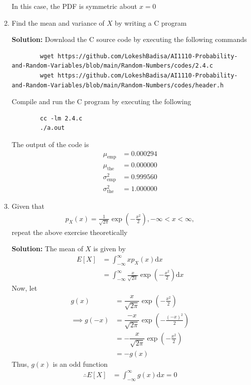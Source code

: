 \documentclass[journal,12pt,twocolumn]{IEEEtran}
\newcommand{\solution}{\noindent \textbf{Solution: }}
\providecommand{\brak}[1]{\ensuremath{\left(#1\right)}}
\providecommand{\mean}[1]{E\left[ #1 \right]}
\numberwithin{equation}{section}
\renewcommand\thesection{\arabic{section}}
\begin{document}
\begin{enumerate}[label=\thesection.\arabic*,ref=\thesection.\theenumi]
	In this case, the PDF is symmetric about $x = 0$
	
	\item Find the mean and variance of $X$ by writing a C program
	
	\solution Download the C source code by executing the following commands
	\begin{lstlisting}
		wget https://github.com/LokeshBadisa/AI1110-Probability-and-Random-Variables/blob/main/Random-Numbers/codes/2.4.c
		wget https://github.com/LokeshBadisa/AI1110-Probability-and-Random-Variables/blob/main/Random-Numbers/codes/header.h
	\end{lstlisting}
	Compile and run the C program by executing the following
	\begin{lstlisting}
		cc -lm 2.4.c
		./a.out
	\end{lstlisting}
	The output of the code is
	\begin{align}
		\mu_{\text{emp}} &= 0.000294 \\
		\mu_{\text{the}} &= 0.000000 \\
		\sigma_{\text{emp}}^2 &= 0.999560 \\
		\sigma_{\text{the}}^2 &= 1.000000
	\end{align}	
	
	\item Given that 
	\begin{align}
		p_{X}(x) = \frac{1}{\sqrt{2\pi}}\exp\brak{-\frac{x^2}{2}}, -\infty < x < \infty,
	\end{align}
	repeat the above exercise theoretically
	
	\solution The mean of $X$ is given by
	\begin{align}
		\mean{X} &= \int_{-\infty}^{\infty} x p_{X}(x) \mathrm{d}x \\
		&= \int_{-\infty}^{\infty} \frac{x}{\sqrt{2\pi}}\exp\brak{-\frac{x^2}{2}} \mathrm{d}x 
	\end{align}
	Now, let
	\begin{align} 
		g(x) &= \dfrac{x}{\sqrt{2\pi}}\exp\brak{-\frac{x^2}{2}} \\
		\implies g(-x) &= \dfrac{-x}{\sqrt{2\pi}}\exp\brak{-\frac{(-x)^2}{2}} \\
		&= - \dfrac{x}{\sqrt{2\pi}}\exp\brak{-\frac{x^2}{2}} \\
		&= - g(x)
	\end{align}
	Thus, $g(x)$ is an odd function 
	\begin{align}
		\therefore \mean{X} &= \int_{-\infty}^{\infty} g(x) \mathrm{d}x = 0
	\end{align}
	

\end{enumerate}
\end{document}
